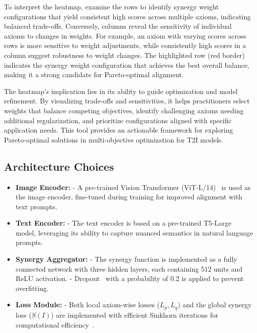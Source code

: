 \begin{itemize}
    To interpret the heatmap, examine the rows to identify synergy weight configurations that yield consistent high scores across multiple axioms, indicating balanced trade-offs. Conversely, columns reveal the sensitivity of individual axioms to changes in weights. For example, an axiom with varying scores across rows is more sensitive to weight adjustments, while consistently high scores in a column suggest robustness to weight changes. The highlighted row (red border) indicates the synergy weight configuration that achieves the best overall balance, making it a strong candidate for Pareto-optimal alignment.

    The heatmap’s implication lies in its ability to guide optimization and model refinement. By visualizing trade-offs and sensitivities, it helps practitioners select weights that balance competing objectives, identify challenging axioms needing additional regularization, and prioritize configurations aligned with specific application needs. This tool provides an actionable framework for exploring Pareto-optimal solutions in multi-objective optimization for T2I models.

\end{itemize}

\subsection{Architecture Choices}
\begin{itemize}
    \item \textbf{Image Encoder:}  
    - A pre-trained Vision Transformer (ViT-L/14)~\cite{dosovitskiy2020image} is used as the image encoder, fine-tuned during training for improved alignment with text prompts.  

    \item \textbf{Text Encoder:}  
    - The text encoder is based on a pre-trained T5-Large~\cite{raffel2020exploring} model, leveraging its ability to capture nuanced semantics in natural language prompts.  

    \item \textbf{Synergy Aggregator:}  
    - The synergy function is implemented as a fully connected network with three hidden layers, each containing 512 units and ReLU activation.  
    - Dropout~\cite{srivastava2014dropout} with a probability of 0.2 is applied to prevent overfitting.  

    \item \textbf{Loss Module:}  
    - Both local axiom-wise losses (\(L_p, L_q\)) and the global synergy loss (\(S(I)\)) are implemented with efficient Sinkhorn iterations for computational efficiency~\cite{cuturi2013sinkhorn}.  
\end{itemize}

